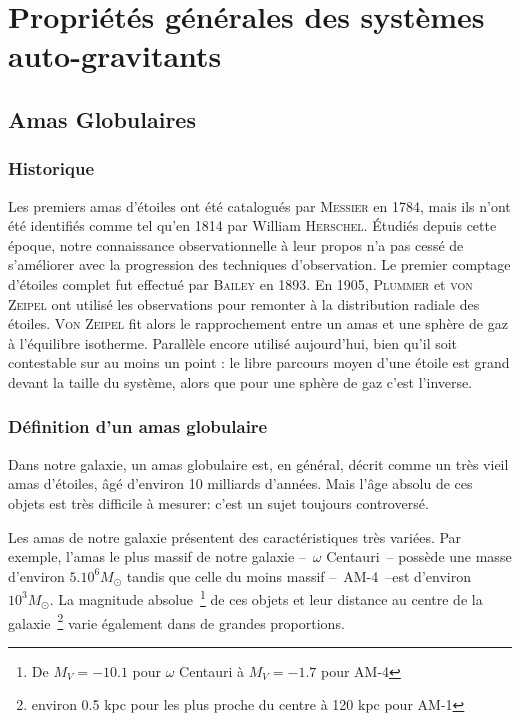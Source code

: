 \normalsize

\chapter{Propriétés générales des systèmes auto-gravitants}


	\minitoc
	\section{Amas Globulaires}
		\subsection{Historique}
			Les premiers amas d'étoiles ont été catalogués par \textsc{Messier} en 1784,
			mais ils n'ont été identifiés comme tel qu'en 1814 par William
			\textsc{Herschel}. Étudiés depuis cette époque, notre connaissance
			observationnelle à leur propos n'a pas cessé de s'améliorer avec la progression
			des techniques d'observation. Le premier comptage d'étoiles complet fut
			effectué par \textsc{Bailey} en 1893. En 1905, \textsc{Plummer} et \textsc{von
			Zeipel}	ont utilisé les observations pour remonter à la distribution radiale
			des étoiles. \textsc{Von Zeipel} fit alors le rapprochement entre un amas et
			une sphère de gaz à l'équilibre isotherme. Parallèle encore utilisé
			aujourd'hui, bien qu'il soit contestable sur au moins un point : le libre
			parcours moyen d'une étoile est grand devant la taille du système, alors que
			pour une sphère de gaz c'est l'inverse.

		\subsection{Définition d'un amas globulaire}
			Dans notre galaxie, un amas globulaire est, en général, décrit comme un
			très vieil amas d'étoiles, âgé d'environ 10 milliards d'années. Mais
			l'âge absolu de ces objets est très difficile à mesurer: c'est un sujet
			toujours controversé.

			Les amas de notre galaxie présentent des caractéristiques très variées. Par
			exemple, l'amas le plus massif de notre galaxie --~$\omega$ Centauri~--
			possède une masse d'environ $5.10^6 M_\odot$ tandis que celle du moins
			massif --~AM-4~--est d'environ $10^3 M_\odot$. La magnitude
			absolue~\footnote{De $M_V = -10.1$ pour $\omega$ Centauri à $M_V = -1.7$
			pour AM-4} de ces objets et leur distance au centre de la
			galaxie~\footnote{environ 0.5 kpc pour les plus proche du centre à 120 kpc
			pour AM-1} varie également dans de grandes proportions.

